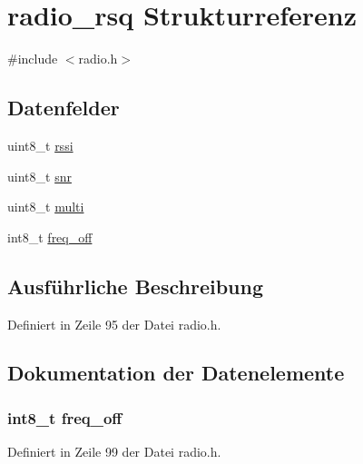 \hypertarget{structradio__rsq}{}\section{radio\+\_\+rsq Strukturreferenz}
\label{structradio__rsq}


{\ttfamily \#include $<$radio.\+h$>$}

\subsection*{Datenfelder}
\begin{DoxyCompactItemize}
\item 
uint8\+\_\+t \hyperlink{structradio__rsq_afb67d818cd76cce8057affabcb1979a6}{rssi}
\item 
uint8\+\_\+t \hyperlink{structradio__rsq_a11be3c6f2d5194542e5d1733cbc7ac76}{snr}
\item 
uint8\+\_\+t \hyperlink{structradio__rsq_af829dbd700d1c5ad1abccbdb52fa7ba9}{multi}
\item 
int8\+\_\+t \hyperlink{structradio__rsq_a168a73926de154445f6c6c77f8b5e53c}{freq\+\_\+off}
\end{DoxyCompactItemize}


\subsection{Ausführliche Beschreibung}


Definiert in Zeile 95 der Datei radio.\+h.



\subsection{Dokumentation der Datenelemente}
\hypertarget{structradio__rsq_a168a73926de154445f6c6c77f8b5e53c}{}
\subsubsection[{freq\+\_\+off}]{\setlength{\rightskip}{0pt plus 5cm}int8\+\_\+t freq\+\_\+off}\label{structradio__rsq_a168a73926de154445f6c6c77f8b5e53c}


Definiert in Zeile 99 der Datei radio.\+h.

\hypertarget{structradio__rsq_af829dbd700d1c5ad1abccbdb52fa7ba9}{}
